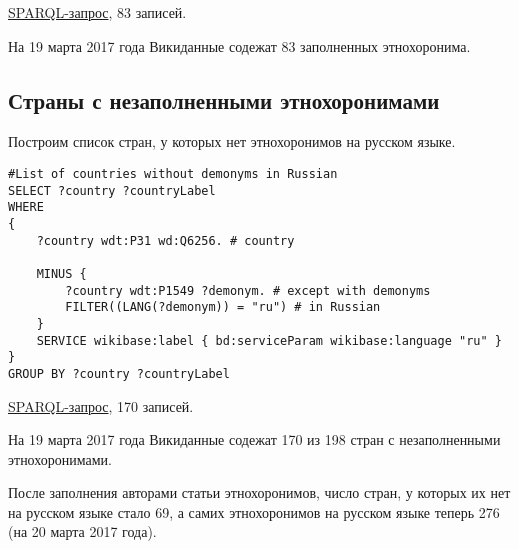 \href{https://query.wikidata.org/#%23List%20of%20demonyms%20in%20Russian%0ASELECT%20%3Fcountry%20%3FcountryLabel%20%3Fdemonym%0AWHERE%0A%7B%0A%09%3Fcountry%20wdt%3AP31%20wd%3AQ6256.%20%20%20%20%20%20%23country%0A%09%3Fcountry%20wdt%3AP1549%20%3Fdemonym%20.%20%20%20%23demonym%0A%09FILTER%28%28LANG%28%3Fdemonym%29%29%20%3D%20%22ru%22%29%0A%09SERVICE%20wikibase%3Alabel%20%7B%20bd%3AserviceParam%20wikibase%3Alanguage%20%22ru%22%20%7D%0A%7D}{SPARQL-запрос}, 83 записей.

На 19 марта 2017 года Викиданные содежат 83 заполненных этнохоронима.

\subsection{Страны с незаполненными этнохоронимами}

Построим список стран, у которых нет этнохоронимов на русском языке.

\begin{lstlisting}[language=SPARQL label=countrywithoutdemonyms, caption=Список стран, у которых нет этнохоронимов на русском языке]
#List of countries without demonyms in Russian
SELECT ?country ?countryLabel 
WHERE
{
    ?country wdt:P31 wd:Q6256. # country
    
    MINUS {
        ?country wdt:P1549 ?demonym. # except with demonyms
        FILTER((LANG(?demonym)) = "ru") # in Russian
    } 
    SERVICE wikibase:label { bd:serviceParam wikibase:language "ru" }
}
GROUP BY ?country ?countryLabel
\end{lstlisting}

\href{https://query.wikidata.org/#%23List%20of%20countries%20without%20demonyms%20in%20Russian%0ASELECT%20%3Fcountry%20%3FcountryLabel%20%0AWHERE%0A%7B%0A%09%3Fcountry%20wdt%3AP31%20wd%3AQ6256.%20%20%20%20%20%20%20%20%20%20%20%20%20%20%23%20country%0A%09MINUS%20%7B%20%3Fcountry%20wdt%3AP1549%20%3Fdemonym.%20%20%20%20%23%20except%20with%20demonyms%0A%20%20%20%20%20%20%20%20%20%20%20%20FILTER%28%28LANG%28%3Fdemonym%29%29%20%3D%20%22ru%22%29%20%23%20in%20Russian%0A%20%20%20%20%20%20%20%20%20%20%7D%20%20%20%20%0A%20%20%20%20%0A%09SERVICE%20wikibase%3Alabel%20%7B%20bd%3AserviceParam%20wikibase%3Alanguage%20%22ru%22%20%7D%0A%7D%0AGROUP%20BY%20%3Fcountry%20%3FcountryLabel}{SPARQL-запрос}, 170 записей. 

На 19 марта 2017 года Викиданные содежат 170 из 198 стран с незаполненными этнохоронимами.

После заполнения авторами статьи этнохоронимов, число стран, у которых их нет на русском языке стало 69, а самих этнохоронимов на русском языке теперь 276 (на 20 марта 2017 года).


